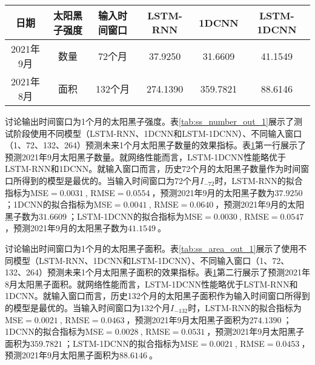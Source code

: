 \begin{table}[!htbp]
\centering
{}
\label{tab:ss_out_1}
\footnotesize
\begin{tabular}{cccccc}
    \toprule
    日期 & 太阳黑子强度 & 输入时间窗口 & LSTM-RNN & 1DCNN & LSTM-1DCNN  \\
    \midrule
    2021年9月 & 数量 & 72个月 & 37.9250 & 31.6609 & 41.1549 \\
    2021年8月 & 面积 & 132个月 & 274.1390 & 359.7821 & 88.6146 \\
    \bottomrule
  \end{tabular}
\end{table}

讨论输出时间窗口为1个月的太阳黑子强度。表\ref{tab:ss_number_out_1}展示了测试阶段使用不同模型（LSTM-RNN、1DCNN和LSTM-1DCNN）、不同输入窗口（1、72、132、264）预测未来1个月太阳黑子数量的效果指标。表\ref{tab:ss_out_1}第一行展示了预测2021年9月太阳黑子数量。就网络性能而言，LSTM-1DCNN性能略优于LSTM-RNN和1DCNN。就输入窗口而言，历史72个月的太阳黑子数量作为时间窗口所得到的模型是最优的。当输入时间窗口为72个月$I_{-72}$时，LSTM-RNN的拟合指标为MSE$=\SI{0.0031}{}$, RMSE$=\SI{0.0554}{}$，预测2021年9月的太阳黑子数为$\SI{37.9250}{}$；1DCNN的拟合指标为MSE$=\SI{0.0041}{}$, RMSE$=\SI{0.0640}{}$，预测2021年9月的太阳黑子数为$\SI{31.6609}{}$；LSTM-1DCNN的拟合指标为MSE$=\SI{0.0030}{}$, RMSE$=\SI{0.0547}{}$，预测2021年9月的太阳黑子数为$\SI{41.1549}{}$。

讨论输出时间窗口为1个月的太阳黑子面积。表\ref{tab:ss_area_out_1}展示了使用不同模型（LSTM-RNN、1DCNN和LSTM-1DCNN）、不同输入窗口（1、72、132、264）预测未来1个月太阳黑子面积的效果指标。表\ref{tab:ss_out_1}第二行展示了预测2021年8月太阳黑子面积。就网络性能而言，LSTM-1DCNN性能略优于LSTM-RNN和1DCNN。就输入窗口而言，历史132个月的太阳黑子面积作为输入时间窗口所得到的模型是最优的。当输入时间窗口为132个月$I_{-132}$时，LSTM-RNN的拟合指标为MSE$=\SI{0.0021}{}$, RMSE$=\SI{0.0463}{}$，预测2021年9月太阳黑子面积为$\SI{274.1390}{}$；1DCNN的拟合指标为MSE$=\SI{0.0028}{}$, RMSE$=\SI{0.0531}{}$，预测2021年9月太阳黑子面积为$\SI{359.7821}{}$；LSTM-1DCNN的拟合指标为MSE$=\SI{0.0021}{}$, RMSE$=\SI{0.0453}{}$，预测2021年9月太阳黑子面积为$\SI{88.6146}{}$。

